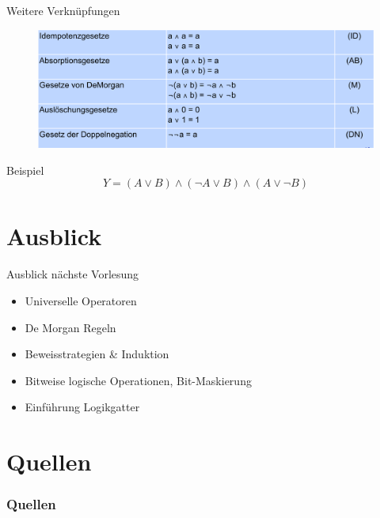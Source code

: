 \documentclass[12pt%
,aspectratio=169%
]{beamer}
\begin{document}
\begin{frame}{Weitere Verknüpfungen}
\begin{figure}
\includegraphics[scale=0.325]{pictures/ops2}
\end{figure}
\cite{hoffmann2020grundlagen}
\end{frame}

\begin{frame}{Beispiel}
$$ Y = (A \lor B) \land (\neg A \lor B) \land (A \lor \neg B) $$
\end{frame}

\section{Ausblick}
\begin{frame}{Ausblick nächste Vorlesung}
\begin{itemize}
	\item Universelle Operatoren
	\item De Morgan Regeln
	\item Beweisstrategien \& Induktion
	\item Bitweise logische Operationen, Bit-Maskierung
	\item Einführung Logikgatter
\end{itemize}

\end{frame}

\section*{Quellen}
\appendix
\begin{frame}[allowframebreaks]
  \frametitle<presentation>{Quellen}
\printbibliography
\end{frame}
\end{document}
